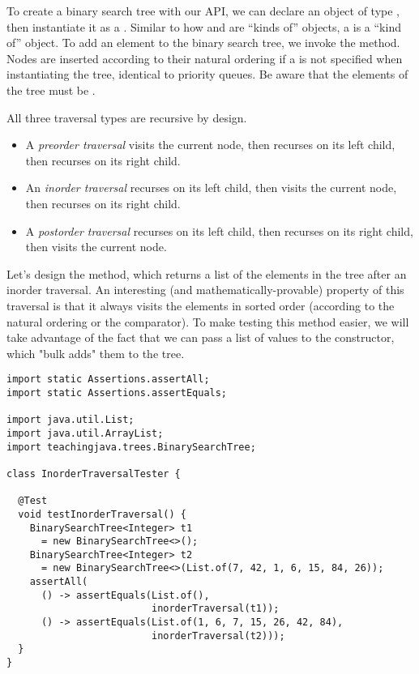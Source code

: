 To create a binary search tree with our API, we can declare an object of type , then instantiate it as a . 
Similar to how  and  are ``kinds of''  objects, a  is a ``kind of''  object.
To add an element to the binary search tree, we invoke the  method. 
Nodes are inserted according to their natural ordering if a  is not specified when instantiating the tree, identical to priority queues. 
Be aware that the elements of the tree must be .

All three traversal types are recursive by design.
\begin{itemize}
  \item A \emph{preorder traversal} visits the current node, then recurses on its left child, then recurses on its right child.
  \item An \emph{inorder traversal} recurses on its left child, then visits the current node, then recurses on its right child.
  \item A \emph{postorder traversal} recurses on its left child, then recurses on its right child, then visits the current node.
\end{itemize}

Let's design the  method, which returns a list of the elements in the tree after an inorder traversal. 
An interesting (and mathematically-provable) property of this traversal is that it always visits the elements in sorted order (according to the natural ordering or the comparator). 
To make testing this method easier, we will take advantage of the fact that we can pass a list of values to the  constructor, which "bulk adds" them to the tree.

\begin{lstlisting}[language=MyJava]
import static Assertions.assertAll;
import static Assertions.assertEquals;

import java.util.List;
import java.util.ArrayList;
import teachingjava.trees.BinarySearchTree;

class InorderTraversalTester {

  @Test
  void testInorderTraversal() {
    BinarySearchTree<Integer> t1 
      = new BinarySearchTree<>();
    BinarySearchTree<Integer> t2 
      = new BinarySearchTree<>(List.of(7, 42, 1, 6, 15, 84, 26));
    assertAll(
      () -> assertEquals(List.of(), 
                         inorderTraversal(t1));
      () -> assertEquals(List.of(1, 6, 7, 15, 26, 42, 84), 
                         inorderTraversal(t2)));
  }
}

\end{lstlisting}

